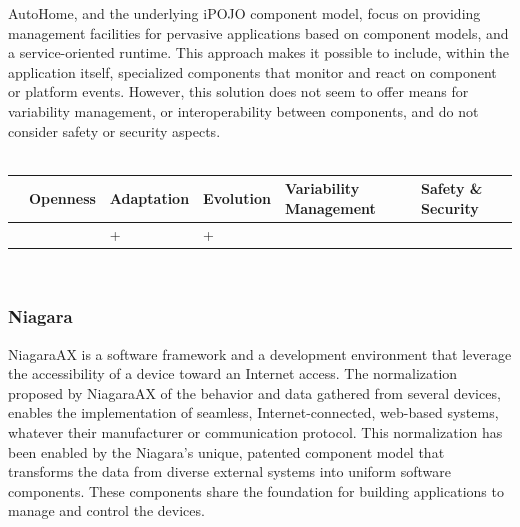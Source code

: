 AutoHome, and the underlying iPOJO component model, focus on providing management facilities for pervasive applications based on component models, and a service-oriented runtime. This approach makes it possible to include, within the application itself, specialized components that monitor and react on component or platform events.
However, this solution does not seem to offer means for variability management, or interoperability between components, and do not consider safety or security aspects.\\
 \\
\begin{tabular}{ >{\centering}m{}| >{\centering}m{} >{\centering}m{}| >{\centering}m{} >{\centering}m{}| >{\centering\arraybackslash}m{}}
{\tiny Interoperability} & {\tiny Openness} & {\tiny Adaptation} & {\tiny Evolution} & {\tiny Variability Management} & {\tiny Safety \& Security}\\
 \hline
  &  & + & + &  & \\ 
  \hline
\end{tabular}\\




\subsubsection{Niagara}

NiagaraAX is a software framework and a development environment that leverage the accessibility of a device toward an Internet access. 
The normalization proposed by NiagaraAX of the behavior and data gathered from several devices, enables the implementation of seamless, Internet-connected, web-based systems, whatever their manufacturer or communication protocol. This normalization has been enabled by the Niagara's unique, patented component model that transforms the data from diverse external systems into uniform software components.
These components share the foundation for building applications to manage and control the devices.\\

